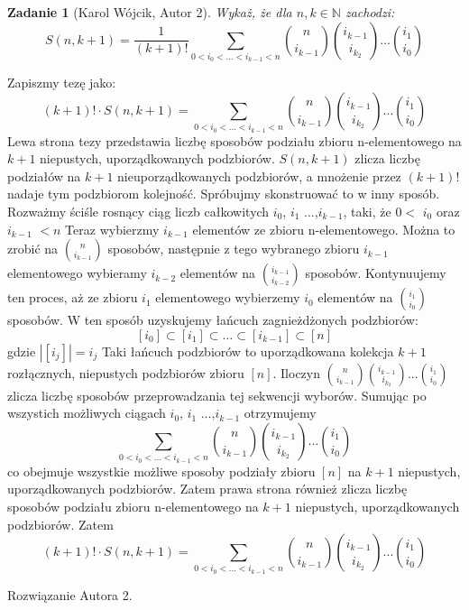 \documentclass{mwart}
\newtheorem{zad}{Zadanie}[section]
\begin{document}
\begin{zad}[Karol Wójcik, Autor 2]
    Wykaż, że dla $n, k \in \mathbb{N}$ zachodzi:
    \[S(n,k+1)=\frac{1}{(k+1)!} \sum_{0<i_0<...<i_{k-1}<n} \binom{n}{i_{k-1}}\binom{i_{k-1}}{i_{k_2}}...\binom{i_1}{i_0}     \]
\end{zad}
\begin{mdframed}
    Zapiszmy tezę jako:
    \[(k+1)! \cdot S(n,k+1) = \sum_{0<i_0<...<i_{k-1}<n} \binom{n}{i_{k-1}}\binom{i_{k-1}}{i_{k_2}}...\binom{i_1}{i_0} \]
    \newline \newline
    Lewa strona tezy przedstawia liczbę sposobów podziału zbioru n-elementowego na $k+1$ niepustych,
    uporządkowanych podzbiorów. $S(n,k+1)$ zlicza liczbę podziałów na $k+1$ nieuporządkowanych podzbiorów,
    a mnożenie przez $(k+1)!$ nadaje tym podzbiorom kolejność.
    \newline \newline
    Spróbujmy skonstruować to w inny sposób. Rozważmy ściśle rosnący ciąg liczb całkowitych $i_0$, $i_1$ $\dots$,$i_{k-1}$,
    taki, że $0<$ $i_0$ oraz $i_{k-1}$ $<n$
    Teraz wybierzmy $i_{k-1}$ elementów ze zbioru n-elementowego. Można to zrobić na $\binom{n}{i_{k-1}}$ sposobów,
    następnie z tego wybranego zbioru $i_{k-1}$ elementowego wybieramy $i_{k-2}$ elementów na $\binom{i_{k-1}}{i_{k-2}}$ sposobów.
    Kontynuujemy ten proces, aż ze zbioru $i_1$ elementowego wybierzemy $i_0$ elementów na $\binom{i_1}{i_0}$ sposobów.
    W ten sposób uzyskujemy łańcuch zagnieżdżonych podzbiorów:
    \newline
    \[[i_0]\subset [i_1]\subset \dots \subset [i_{k-1}] \subset [n] \]
    \newline
    gdzie $|[i_j]| = i_j$
    \newline
    Taki łańcuch podzbiorów to uporządkowana kolekcja $k+1$ rozłącznych, niepustych podzbiorów zbioru $[n]$.
    Iloczyn $\binom{n}{i_{k-1}}\binom{i_{k-1}}{i_{k_2}}...\binom{i_1}{i_0}$ zlicza liczbę sposobów przeprowadzania tej sekwencji wyborów.
    Sumując po wszystich możliwych ciągach $i_0$, $i_1$ $\dots$,$i_{k-1}$ otrzymujemy
    \newline
    \[\sum_{0<i_0<...<i_{k-1}<n} \binom{n}{i_{k-1}}\binom{i_{k-1}}{i_{k_2}}...\binom{i_1}{i_0} \]
    \newline
    co obejmuje wszystkie możliwe sposoby podziały zbioru $[n]$ na $k+1$ niepustych, uporządkowanych podzbiorów.
    \newline
    Zatem prawa strona również zlicza liczbę sposobów podziału zbioru n-elementowego na $k+1$ niepustych, uporządkowanych podzbiorów.
    \newline
    Zatem
    \newline
    \[(k+1)! \cdot S(n,k+1) = \sum_{0<i_0<...<i_{k-1}<n} \binom{n}{i_{k-1}}\binom{i_{k-1}}{i_{k_2}}...\binom{i_1}{i_0} \]
\end{mdframed}
\begin{mdframed}
    Rozwiązanie Autora 2.
\end{mdframed}
\end{document}
